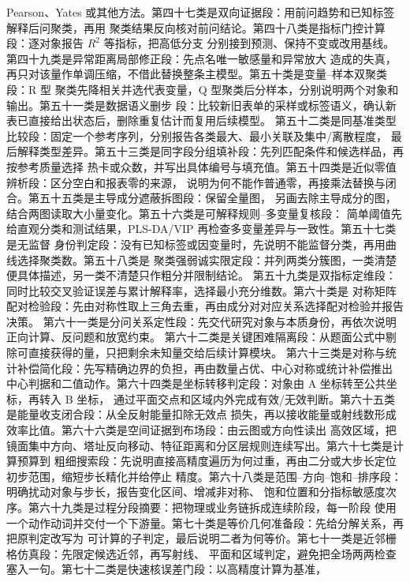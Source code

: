 \documentclass[UTF8,a4paper,12pt]{ctexart}
\begin{document}
Pearson、Yates 或其他方法。第四十七类是双向证据段：用前问趋势和已知标签解释后问聚类，再用
聚类结果反向核对前问结论。第四十八类是指标门控计算段：逐对象报告 $R^2$ 等指标，把高低分支
分别接到预测、保持不变或改用基线。第四十九类是异常距离局部修正段：先点名唯一敏感量和异常放大
造成的失真，再只对该量作单调压缩，不借此替换整条主模型。第五十类是变量--样本双聚类段：R 型
聚类先降相关并选代表变量，Q 型聚类后分样本，分别说明两个对象和输出。第五十一类是数据语义删步
段：比较新旧表单的采样或标签语义，确认新表已直接给出状态后，删除重复估计而复用后续模型。
第五十二类是同基准类型比较段：固定一个参考序列，分别报告各类最大、最小关联及集中/离散程度，
最后解释类型差异。第五十三类是同字段分组填补段：先列匹配条件和候选样品，再按参考质量选择
热卡或众数，并写出具体编号与填充值。第五十四类是近似零值辨析段：区分空白和报表零的来源，
说明为何不能作普通零，再接乘法替换与闭合。第五十五类是主导成分遮蔽拆图段：保留全量图，
另画去除主导成分的图，结合两图读取大小量变化。第五十六类是可解释规则--多变量复核段：
简单阈值先给直观分类和测试结果，PLS-DA/VIP 再检查多变量差异与一致性。第五十七类是无监督
身份判定段：没有已知标签或因变量时，先说明不能监督分类，再用曲线选择聚类数。第五十八类是
聚类强弱诚实限定段：并列两类分簇图，一类清楚便具体描述，另一类不清楚只作粗分并限制结论。
第五十九类是双指标定维段：同时比较交叉验证误差与累计解释率，选择最小充分维数。第六十类是
对称矩阵配对检验段：先由对称性取上三角去重，再由成分对对应关系选择配对检验并报告决策。
第六十一类是分问关系定性段：先交代研究对象与本质身份，再依次说明正向计算、反问题和放宽约束。
第六十二类是关键困难隔离段：从题面公式中剔除可直接获得的量，只把剩余未知量交给后续计算模块。
第六十三类是对称与统计补偿简化段：先写精确边界的负担，再由数量占优、中心对称或统计补偿推出
中心判据和二值动作。第六十四类是坐标转移判定段：对象由 A 坐标转至公共坐标，再转入 B 坐标，
通过平面交点和区域内外完成有效/无效判断。第六十五类是能量收支闭合段：从全反射能量扣除无效点
损失，再以接收能量或射线数形成效率比值。第六十六类是空间证据到布场段：由云图或方向性读出
高效区域，把镜面集中方向、塔址反向移动、特征距离和分区层规则连续写出。第六十七类是计算预算到
粗细搜索段：先说明直接高精度遍历为何过重，再由二分或大步长定位初步范围，缩短步长精化并给停止
精度。第六十八类是范围--方向--饱和--排序段：明确扰动对象与步长，报告变化区间、增减非对称、
饱和位置和分指标敏感度次序。第六十九类是过程分段摘要：把物理或业务链拆成连续阶段，每一阶段
使用一个动作动词并交付一个下游量。第七十类是等价几何准备段：先给分解关系，再把原判定改写为
可计算的子判定，最后说明二者为何等价。第七十一类是近邻栅格仿真段：先限定候选近邻，再写射线、
平面和区域判定，避免把全场两两检查塞入一句。第七十二类是快速核误差门段：以高精度计算为基准，
\end{document}
